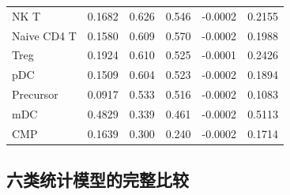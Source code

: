 {\begin{longtable}{lrrrrr}
NK T & 0.1682 & 0.626 & 0.546 & -0.0002 & 0.2155\\
Naive CD4 T & 0.1580 & 0.609 & 0.570 & -0.0002 & 0.1988\\
Treg & 0.1924 & 0.610 & 0.525 & -0.0001 & 0.2426\\
pDC & 0.1509 & 0.604 & 0.523 & -0.0002 & 0.1894\\
Precursor & 0.0917 & 0.533 & 0.516 & -0.0002 & 0.1083\\
mDC & 0.4829 & 0.339 & 0.461 & -0.0002 & 0.5113\\
CMP & 0.1639 & 0.300 & 0.240 & -0.0002 & 0.1714\\
\bottomrule\end{longtable}}
\clearpage\subsection{六类统计模型的完整比较}
